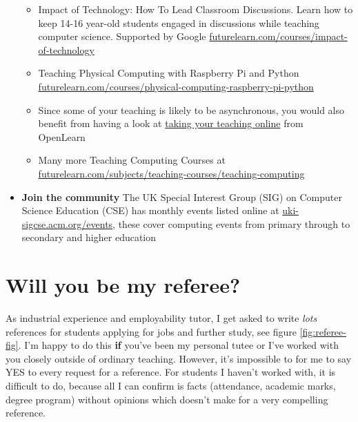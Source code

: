 \documentclass[
  12pt,
]{book}
\providecommand{\tightlist}{%
  \setlength{\itemsep}{0pt}\setlength{\parskip}{0pt}}
\begin{document}
\begin{itemize}
  \begin{itemize}
  \tightlist
  \item
    Impact of Technology: How To Lead Classroom Discussions. Learn how to keep 14-16 year-old students engaged in discussions while teaching computer science. Supported by Google \href{https://www.futurelearn.com/courses/impact-of-technology}{futurelearn.com/courses/impact-of-technology}
  \item
    Teaching Physical Computing with Raspberry Pi and Python \href{https://www.futurelearn.com/courses/physical-computing-raspberry-pi-python}{futurelearn.com/courses/physical-computing-raspberry-pi-python}
  \item
    Since some of your teaching is likely to be asynchronous, you would also benefit from having a look at \href{https://www.open.edu/openlearn/education-development/education/take-your-teaching-online/content-section-overview}{taking your teaching online} from OpenLearn
  \item
    Many more Teaching Computing Courses at \href{https://www.futurelearn.com/subjects/teaching-courses/teaching-computing}{futurelearn.com/subjects/teaching-courses/teaching-computing}
  \end{itemize}
\item
  \textbf{Join the community} The UK Special Interest Group (SIG) on Computer Science Education (CSE) has monthly events listed online at \href{https://uki-sigcse.acm.org/events}{uki-sigcse.acm.org/events}, these cover computing events from primary through to secondary and higher education
\end{itemize}

\hypertarget{referee}{%
\chapter{Will you be my referee?}\label{referee}}

As industrial experience and employability tutor, I get asked to write \emph{lots} references for students applying for jobs and further study, see figure \ref{fig:referee-fig}. I'm happy to do this \textbf{if} you've been my personal tutee or I've worked with you closely outside of ordinary teaching. However, it's impossible to for me to say YES to every request for a reference. For students I haven't worked with, it is difficult to do, because all I can confirm is facts (attendance, academic marks, degree program) without opinions which doesn't make for a very compelling reference.
\end{document}
